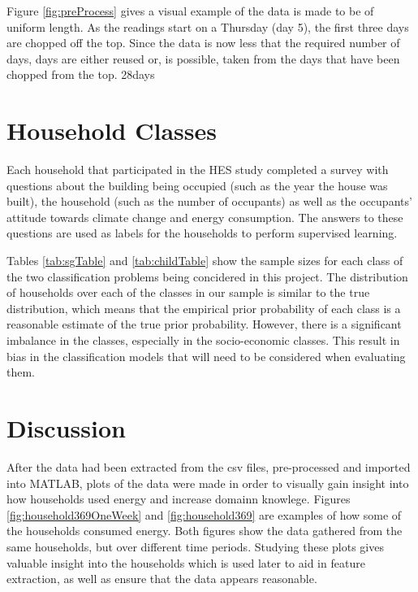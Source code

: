 Figure \ref{fig:preProcess} gives a visual example of the data is made to be of uniform length. As the readings start on a Thursday (day 5), the first three days are chopped off the top. Since the data is now less that the required number of days, days are either reused or, is possible, taken from the days that have been chopped from the top.
\to28days

\section{Household Classes}

Each household that participated in the HES study completed a survey with questions about the building being occupied (such as the year the house was built), the household (such as the number of occupants) as well as the occupants' attitude towards climate change and energy consumption. The answers to these questions are used as labels for the households to perform supervised learning.

\sgTable

Tables \ref{tab:sgTable} and \ref{tab:childTable} show the sample sizes for each class of the two classification problems being concidered in this project. The distribution of households over each of the classes in our sample is similar to the true distribution, which means that the empirical prior probability of each class is a reasonable estimate of the true prior probability. However, there is a significant imbalance in the classes, especially in the socio-economic classes. This result in bias in the classification models that will need to be considered when evaluating them.
\childTable

\section{Discussion}

After the data had been extracted from the csv files, pre-processed and imported into MATLAB, plots of the data were made in order to visually gain insight into how households used energy and increase domainn knowlege. Figures \ref{fig:household369OneWeek} and \ref{fig:household369} are examples of how some of the households consumed energy. Both figures show the data gathered from the same households, but over different time periods. Studying these plots gives valuable insight into the households which is used later to aid in feature extraction, as well as ensure that the data appears reasonable. 

